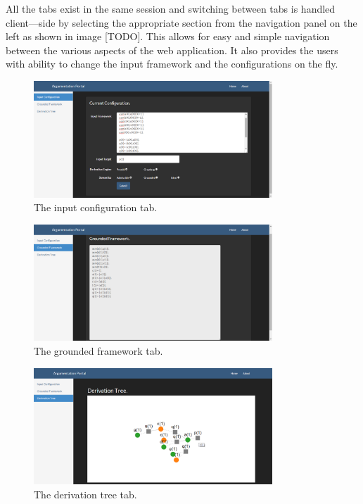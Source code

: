 All the tabs exist in the same session and switching between tabs is handled client---side by selecting the appropriate section from the navigation panel on the left as shown in image [TODO]. This allows for easy and simple navigation between the various aspects of the web application. It also provides the users with ability to change the input framework and the configurations on the fly.

\begin{figure}[h]
    \centering
    \includegraphics[width=0.8\textwidth]{argumentationInputFull.png}
    \caption{The input configuration tab.}
    \label{fig:arg_input_tab}
\end{figure}

\begin{figure}[h]
    \centering
    \includegraphics[width=0.8\textwidth]{argumentationGrounded.png}
    \caption{The grounded framework tab.}
    \label{fig:arg_grounded_tab}
\end{figure}

\begin{figure}[h]
    \centering
    \includegraphics[width=0.8\textwidth]{argumentationTree.png}
    \caption{The derivation tree tab.}
    \label{fig:arg_tree_tab}
\end{figure}

